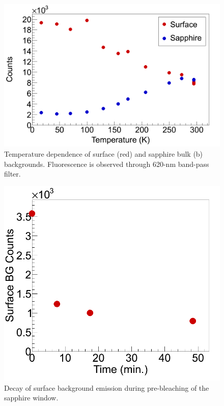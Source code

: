 



\begin{figure} %
        \centering
                \includegraphics[width=.6\textwidth]{figures/bg_temp_dep.png}
                \caption{Temperature dependence of surface (red) and sapphire bulk (b) backgrounds. Fluorescence is observed through 620-nm band-pass filter.}
\label{fig:BGtempDependence}
\end{figure}

\begin{figure} %
        \centering
                \includegraphics[width=.4\textwidth]{figures/Bleach_SurfaceBG_20150807_part1_vsTime.png}
                \caption{Decay of surface background emission during pre-bleaching of the sapphire window.}
\label{fig:surfBGbleach}
\end{figure}

